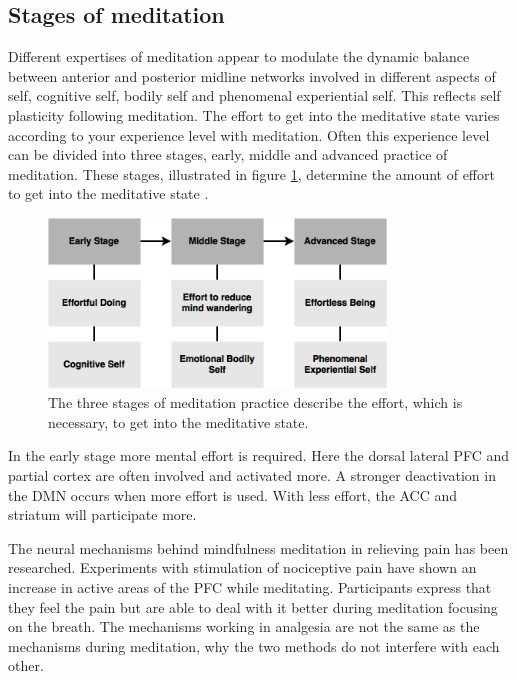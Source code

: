 \subsection{Stages of meditation}
Different expertises of meditation appear to modulate the dynamic balance between anterior and posterior midline networks involved in different aspects of self, cognitive self, bodily self and phenomenal experiential self. This reflects self plasticity following meditation. 
The effort to get into the meditative state varies according to your experience level with meditation. Often this experience level can be divided into three stages, early, middle and advanced practice of meditation. These stages, illustrated in figure \ref{fig:meditation_stages}, determine the amount of effort to get into the meditative state \cite{Tang2017}. 

\begin{figure}[H]
\includegraphics[width=0.8\textwidth]{figures/stages_of_meditation.png} 
	\caption{The three stages of meditation practice describe the effort, which is necessary, to get into the meditative state. \cite{Tang2017}}
	\label{fig:meditation_stages}  
\end{figure}  

In the early stage more mental effort is required. Here the dorsal lateral PFC and partial cortex are often involved and activated more. A stronger deactivation in the DMN occurs when more effort is used. With less effort, the ACC and striatum will participate more. \cite{Tang2017}

The neural mechanisms behind mindfulness meditation in relieving pain has been researched. Experiments with stimulation of nociceptive pain have shown an increase in active areas of the PFC while meditating. Participants express that they feel the pain but are able to deal with it better during meditation focusing on the breath. 
The mechanisms working in analgesia are not the same as the mechanisms during meditation, why the two methods do not interfere with each other. \cite{Jacob2016}

